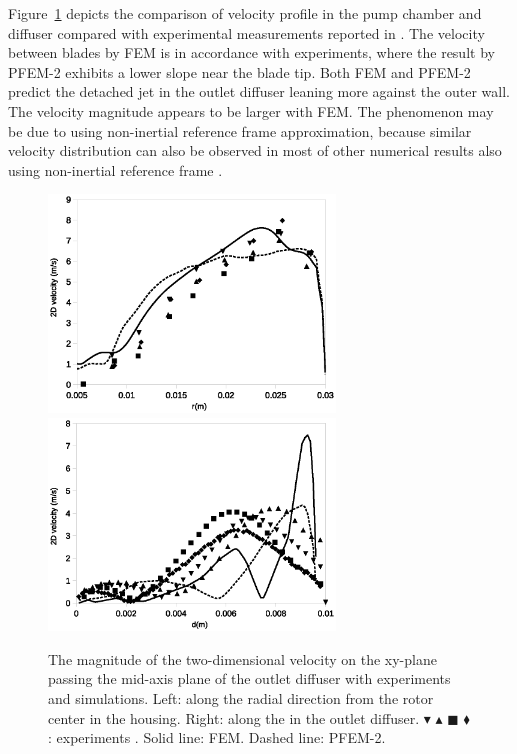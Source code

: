 Figure~\ref{fig:pumpvelprofile} depicts the comparison of velocity profile in the pump chamber and diffuser compared with experimental measurements reported in \cite{mali_cfd}. The velocity between blades by FEM is in accordance with experiments, where the result by PFEM-2 exhibits a lower slope near the blade tip. Both FEM and PFEM-2 predict the detached jet in the outlet diffuser leaning more against the outer wall. The velocity magnitude appears to be larger with FEM. The phenomenon may be due to using non-inertial reference frame approximation, because similar velocity distribution can also be observed in most of other numerical results also using non-inertial reference frame \cite{mali_cfd}. 
 
\begin{figure}[htbp]
    \centering
    \includegraphics[width=3in]{imgs/nozzle_pump/pump_velblade.eps}\\
    \vspace{.5cm}
    \includegraphics[width=3in]{imgs/nozzle_pump/pump_veldiffuser.eps}
    \caption{The magnitude of the two-dimensional velocity on the xy-plane passing the mid-axis plane of the outlet diffuser with experiments and simulations. Left: along the radial direction from the rotor center in the housing. Right: along the in the outlet diffuser. $\blacktriangledown$ $\blacktriangle$ $\blacksquare$ $\blacklozenge$: experiments \cite{mali_cfd}. Solid line: FEM. Dashed line: PFEM-2. }
    \label{fig:pumpvelprofile}
\end{figure}
